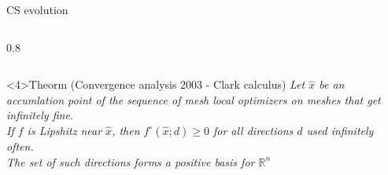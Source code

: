 \documentclass[8pt]{beamer}
\begin{document}
\begin{frame}{CS evolution}
\begin{columns}[T]
\begin{column}{0.8\textwidth}
{\begin{center}
        \end{center}
      }
    \end{column}
  \end{columns}
  \begin{block}<4>{Theorm (Convergence analysis 2003 - Clark calculus)}
    {\it Let $\hat{x}$ be an accumlation point of the sequence of mesh local optimizers on meshes that get infinitely fine.\\
    If $f$ is Lipshitz near $\hat{x}$, then $f^{\circ}(\hat{x};d)\geq 0$ for all directions $d$ used infinitely often.\\
    The set of such directions forms a positive basis for $\mathbb{R}^{n}$}
  \end{block}
  
\end{frame}
\end{document}
